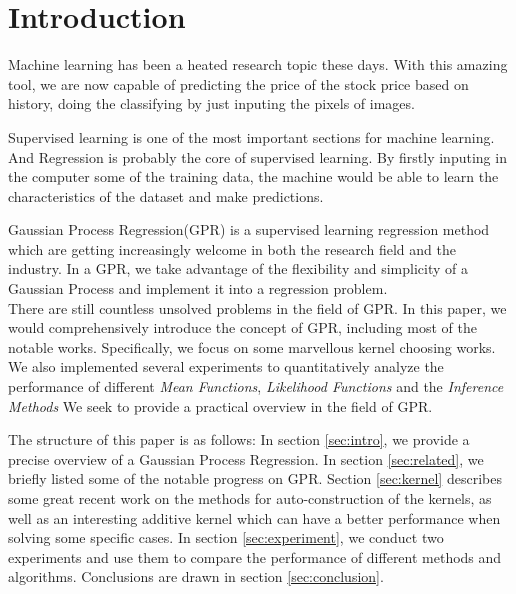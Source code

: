 \section{Introduction} \label{sec:introduction}

Machine learning has been a heated research topic these days. With this amazing tool, we are now capable of predicting the price of the stock price based on history, doing the classifying by just inputing the pixels of images.

Supervised learning is one of the most important sections for machine learning. And Regression is probably the core of supervised learning. By firstly inputing in the computer some of the training data, the machine would be able to learn the characteristics of the dataset and make predictions.

Gaussian Process Regression(GPR) is a supervised learning regression method which are getting increasingly welcome in both the research field and the industry. 
In a GPR, we take advantage of the flexibility and simplicity of a Gaussian Process and implement it into a regression problem. \\

There are still countless unsolved problems in the field of GPR.
In this paper, we would comprehensively introduce the concept of GPR, including most of the notable works.
Specifically, we focus on some marvellous kernel choosing works.
We also implemented several experiments to quantitatively analyze the performance of different \emph{Mean Functions}, \emph{Likelihood Functions} and the \emph{Inference Methods}
We seek to provide a practical overview in the field of GPR.

The structure of this paper is as follows: 
In section \ref{sec:intro}, we provide a precise overview of a Gaussian Process Regression. 
In section \ref{sec:related}, we briefly listed some of the notable progress on GPR.
Section \ref{sec:kernel} describes some great recent work on the methods for auto-construction of the kernels, as well as an interesting additive kernel which can have a better performance when solving some specific cases.
In section \ref{sec:experiment}, we conduct two experiments and use them to compare the performance of different methods and algorithms.
Conclusions are drawn in section \ref{sec:conclusion}.

